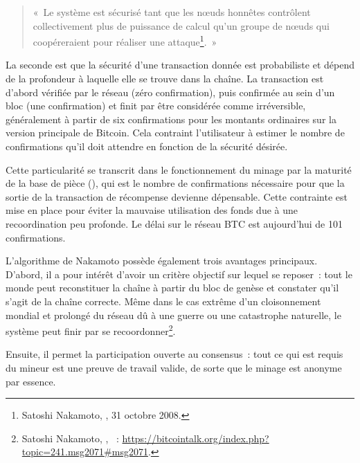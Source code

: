 \begin{quote}
«~Le système est sécurisé tant que les nœuds honnêtes contrôlent collectivement plus de puissance de calcul qu'un groupe de nœuds qui coopéreraient pour réaliser une attaque\footnote{Satoshi Nakamoto, , 31 octobre 2008.}.~»
\end{quote}

La seconde est que la sécurité d'une transaction donnée est probabiliste et dépend de la profondeur à laquelle elle se trouve dans la chaîne. La transaction est d'abord vérifiée par le réseau (zéro confirmation), puis confirmée au sein d'un bloc (une confirmation) et finit par être considérée comme irréversible, généralement à partir de six confirmations pour les montants ordinaires sur la version principale de Bitcoin. Cela contraint l'utilisateur à estimer le nombre de confirmations qu'il doit attendre en fonction de la sécurité désirée.

Cette particularité se transcrit dans le fonctionnement du minage par la maturité de la base de pièce (), qui est le nombre de confirmations nécessaire pour que la sortie de la transaction de récompense devienne dépensable. Cette contrainte est mise en place pour éviter la mauvaise utilisation des fonds due à une recoordination peu profonde. Le délai sur le réseau BTC est aujourd'hui de 101 confirmations.


L'algorithme de Nakamoto possède également trois avantages principaux. D'abord, il a pour intérêt d'avoir un critère objectif sur lequel se reposer~: tout le monde peut reconstituer la chaîne à partir du bloc de genèse et constater qu'il s'agit de la chaîne correcte. Même dans le cas extrême d'un cloisonnement mondial et prolongé du réseau dû à une guerre ou une catastrophe naturelle, le système peut finir par se recoordonner\footnote{Satoshi Nakamoto, , ~: \url{https://bitcointalk.org/index.php?topic=241.msg2071\#msg2071}.}.

Ensuite, il permet la participation ouverte au consensus~: tout ce qui est requis du mineur est une preuve de travail valide, de sorte que le minage est anonyme par essence.

